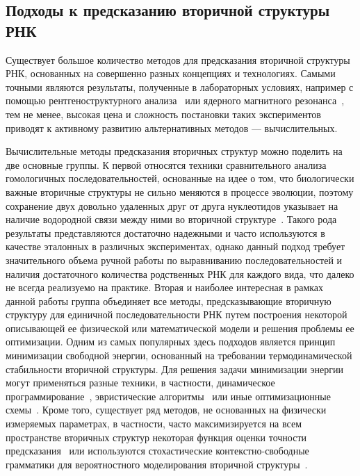 \subsection{Подходы к предсказанию вторичной структуры РНК}
Существует большое количество  методов для предсказания вторичной структуры РНК, основанных на совершенно разных концепциях и технологиях. Самыми точными являются результаты, полученные в лабораторных условиях, например с помощью рентгеноструктурного анализа~\cite{westhof2015twenty} или ядерного магнитного резонанса~\cite{furtig2003nmr}, тем не менее, высокая цена и сложность постановки таких экспериментов приводят к активному развитию альтернативных методов --- вычислительных.

Вычислительные методы предсказания вторичных структур можно поделить на две основные группы. К первой относятся техники сравнительного анализа гомологичных последовательностей, основанные на идее о том, что биологически важные вторичные структуры не сильно меняются в процессе эволюции, поэтому сохранение двух довольно удаленных друг от друга нуклеотидов указывает на наличие водородной связи между ними во вторичной структуре~\cite{gutell2002accuracy,chen1999rna}. Такого рода результаты представляются достаточно надежными и часто используются в качестве эталонных в различных экспериментах, однако данный подход требует значительного объема ручной работы по выравниванию последовательностей и наличия достаточного количества родственных РНК для каждого вида, что далеко не всегда реализуемо на практике. Вторая и наиболее интересная в рамках данной работы группа объединяет все методы, предсказывающие вторичную структуру для единичной последовательности РНК путем построения некоторой описывающей ее физической или математической модели и решения проблемы ее оптимизации. 
Одним из самых популярных здесь подходов является принцип минимизации свободной энергии, основанный на требовании термодинамической стабильности вторичной структуры. Для решения задачи минимизации энергии могут применяться разные техники, в частности, динамическое программирование~\cite{bellaousov2013rnastructure,rivas1999dynamic}, эвристические алгоритмы~\cite{ren2005hotknots,ruan2004ilm} или иные оптимизационные схемы~\cite{reeder2007pknotsrg, jabbari2018knotty}. Кроме того, существует ряд методов, не основанных на физически измеряемых параметрах, в частности, часто максимизируется на всем пространстве вторичных структур некоторая функция оценки точности предсказания~\cite{hamada2009prediction,sato2009centroidfold} или используются стохастические контекстно-свободные грамматики для вероятностного моделирования вторичной структуры~\cite{knudsen1999rna,dowell2004evaluation}. 

